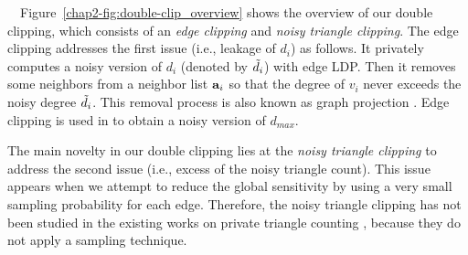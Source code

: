 \smallskip
{}~~Figure~\ref{chap2-fig:double-clip_overview} shows 
the overview of our double clipping, which consists of an 
\textit{edge clipping} 
and \textit{noisy triangle clipping}. 
The edge clipping 
addresses the first issue (i.e., leakage of $d_i$) 
as follows. 
It privately computes 
a noisy version of 
$d_i$ (denoted by $\tilde{d}_i$) with edge LDP. 
Then it 
removes some neighbors from a neighbor list $\mathbf{a}_i$ so that the degree of $v_i$ never exceeds 
the noisy degree $\tilde{d}_i$. 
This removal process is also known as graph projection \cite{Day_SIGMOD16,Ding_TKDE21,Kasiviswanathan_TCC13,Raskhodnikova_arXiv15}. 
Edge clipping 
is 
used in \cite{Imola_USENIX21} to obtain a 
noisy version of 
$d_{max}$. 

The main novelty in our double clipping lies at the \textit{noisy triangle clipping} to address the second issue (i.e., excess of the noisy triangle count). 
This issue appears 
when 
we attempt to reduce the global sensitivity by using 
a very small sampling probability for each edge. 
Therefore, the noisy triangle clipping has not been studied in the existing works on private triangle counting 
\cite{Ding_TKDE21,Imola_USENIX21,Karwa_PVLDB11,Kasiviswanathan_TCC13,Sun_CCS19,Ye_ICDE20,Ye_TKDE21,Zhang_SIGMOD15}, 
because they do not apply a sampling technique. 

